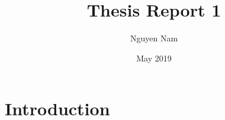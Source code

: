 \documentclass{article}
\title{Thesis Report 1}
\author{Nguyen Nam}
\date{May 2019}
\begin{document}
\maketitle

\section{Introduction}
\end{document}
